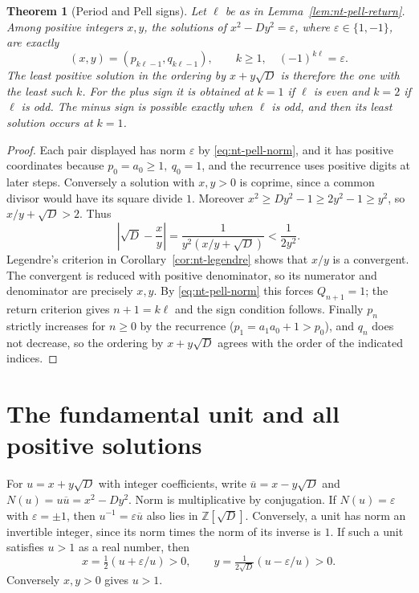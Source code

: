 \documentclass[11pt,oneside,openany]{book}
\theoremstyle{plain}
\newtheorem{theorem}{Theorem}[chapter]
\theoremstyle{definition}
\theoremstyle{remark}
\begin{document}
\begin{theorem}[Period and Pell signs]\label{nt:D08}
Let \(\ell\) be as in Lemma~\ref{lem:nt-pell-return}. Among positive
integers \(x,y\), the solutions of \(x^2-Dy^2=\varepsilon\), where
\(\varepsilon\in\{1,-1\}\), are exactly
\[
 (x,y)=(p_{k\ell-1},q_{k\ell-1}),\qquad
 k\ge1,\quad (-1)^{k\ell}=\varepsilon .
\]
The least positive solution in the ordering by \(x+y\sqrt D\)
is therefore the one with the least such \(k\). For the plus sign
it is obtained at \(k=1\) if \(\ell\) is even and \(k=2\) if
\(\ell\) is odd. The minus sign is possible exactly when \(\ell\)
is odd, and then its least solution occurs at \(k=1\).
\end{theorem}
\begin{proof}
Each pair displayed has norm \(\varepsilon\) by
\eqref{eq:nt-pell-norm}, and it has positive coordinates because
\(p_0=a_0\ge1,\ q_0=1\), and the recurrence uses positive digits
at later steps. Conversely a solution with \(x,y>0\) is coprime,
since a common divisor would have its square divide \(1\).
Moreover \(x^2\ge D y^2-1\ge2y^2-1\ge y^2\), so
\(x/y+\sqrt D>2\). Thus
\[
 \left|\sqrt D-\frac{x}{y}\right|
 =\frac{1}{y^2(x/y+\sqrt D)}<\frac{1}{2y^2}.
\]
Legendre's criterion in Corollary~\ref{cor:nt-legendre} shows that \(x/y\) is
a convergent. The convergent is reduced with positive denominator,
so its numerator and denominator are precisely \(x,y\).
By \eqref{eq:nt-pell-norm} this forces \(Q_{n+1}=1\); the return
criterion gives \(n+1=k\ell\) and the sign condition follows.
Finally \(p_n\) strictly increases for \(n\ge0\) by the recurrence
(\(p_1=a_1a_0+1>p_0\)), and \(q_n\) does not decrease, so the
ordering by \(x+y\sqrt D\) agrees with the order of the indicated
indices.
\end{proof}

\section{The fundamental unit and all positive solutions}

For \(u=x+y\sqrt D\) with integer coefficients, write
\(\overline u=x-y\sqrt D\) and \(N(u)=u\overline u=x^2-Dy^2\).
Norm is multiplicative by conjugation. If \(N(u)=\varepsilon\) with
\(\varepsilon=\pm1\), then \(u^{-1}=\varepsilon\overline u\)
also lies in \(\mathbb Z[\sqrt D]\). Conversely, a unit has norm
an invertible integer, since its norm times the norm of its inverse
is \(1\). If such a unit satisfies \(u>1\) as a real number, then
\[
 x=\tfrac12(u+\varepsilon/u)>0,\qquad
 y=\tfrac1{2\sqrt D}(u-\varepsilon/u)>0.
\]
Conversely \(x,y>0\) gives \(u>1\).
\end{document}
